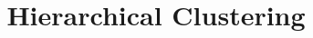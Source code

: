 \title{Hierarchical Clustering}
\label{chp:hierarchical-clustering}
\author{}
\institute{}
\maketitle